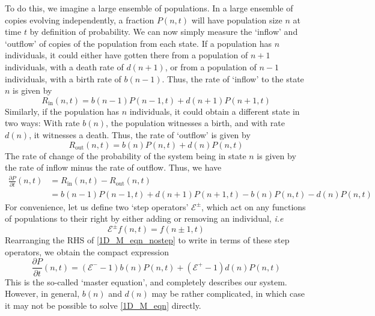 To do this, we imagine a large ensemble of populations. In a large ensemble of copies evolving independently, a fraction $P(n,t)$ will have population size $n$ at time $t$ by definition of probability. We can now simply measure the `inflow' and `outflow' of copies of the population from each state. If a population has $n$ individuals, it could either have gotten there from a population of $n+1$ individuals, with a death rate of $d(n+1)$, or from a population of $n-1$ individuals, with a birth rate of $b(n-1)$. Thus, the rate of `inflow' to the state $n$ is given by
\begin{equation}
\label{1D_rate_in}
R_{\textrm{in}}(n,t) = b(n-1)P(n-1,t) + d(n+1)P(n+1,t)
\end{equation}
Similarly, if the population has $n$ individuals, it could obtain a different state in two ways: With rate $b(n)$, the population witnesses a birth, and with rate $d(n)$, it witnesses a death. Thus, the rate of `outflow' is given by
\begin{equation}
\label{1D_rate_out}
R_{\textrm{out}}(n,t) = b(n)P(n,t) + d(n)P(n,t)
\end{equation}
The rate of change of the probability of the system being in state $n$ is given by the rate of inflow minus the rate of outflow. Thus, we have
\begin{align}
\frac{\partial P}{\partial t}(n,t) &= R_{\textrm{in}}(n,t) - R_{\textrm{out}}(n,t)\nonumber\\
&= b(n-1)P(n-1,t) + d(n+1)P(n+1,t) - b(n)P(n,t) - d(n)P(n,t)\label{1D_M_eqn_nostep}
\end{align}
For convenience, let us define two `step operators' $\mathcal{E}^{\pm}$, which act on any functions of populations to their right by either adding or removing an individual, \textit{i.e}
\begin{equation*}
\mathcal{E}^{\pm}f(n,t) = f(n \pm 1,t)
\end{equation*}
Rearranging the RHS of \eqref{1D_M_eqn_nostep} to write in terms of these step operators, we obtain the compact expression
\begin{equation}
\label{1D_M_eqn}
\frac{\partial P}{\partial t}(n,t) = (\mathcal{E}^{-}-1)b(n)P(n,t) + (\mathcal{E}^{+}-1)d(n)P(n,t)
\end{equation}
This is the so-called `master equation', and completely describes our system. However, in general, $b(n)$ and $d(n)$ may be rather complicated, in which case it may not be possible to solve \eqref{1D_M_eqn} directly.

